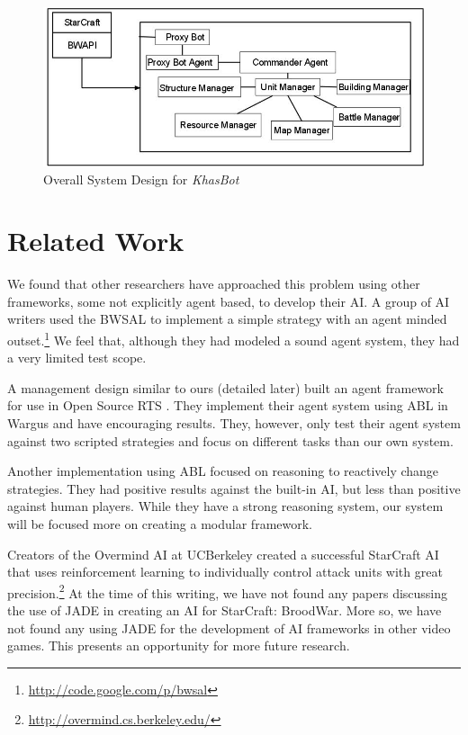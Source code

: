 \documentclass[letterpaper]{article}
\begin{document}
\begin{figure}[htp]
\begin{center}
\includegraphics[scale=0.4]{AgentDesignFigure.jpg}
\caption{Overall System Design for \emph{KhasBot}}
\label{fig:System}
\end{center}
\end{figure}

\section{Related Work}
We found that other researchers have approached this problem using other frameworks, some not explicitly agent based, to develop their AI.  A group of AI writers \cite{CrapPaper} used the BWSAL to implement a simple strategy with an agent minded outset.\footnote{\url{http://code.google.com/p/bwsal}}  We feel that, although they had modeled a sound agent system, they had a very limited test scope.

A management design similar to ours (detailed later) built an agent framework for use in Open Source RTS \cite{McCoy}.  They implement their agent system using ABL in Wargus and have encouraging results.  They, however, only test their agent system against two scripted strategies and focus on different tasks than our own system.  

Another implementation using ABL \cite{Weber} focused on reasoning to reactively change strategies.  They had positive results against the built-in AI, but less than positive against human players.  While they have a strong reasoning system, our system will be focused more on creating a modular framework.

Creators of the Overmind AI at UCBerkeley created a successful StarCraft AI that uses reinforcement learning to individually control attack units with great precision.\footnote{\url{http://overmind.cs.berkeley.edu/}}
At the time of this writing, we have not found any papers discussing the use of JADE in creating an AI for StarCraft: BroodWar.  More so, we have not found any using JADE for the development of AI frameworks in other video games.  This presents an opportunity for more future research.
\end{document}
